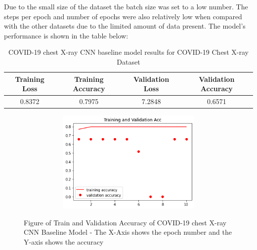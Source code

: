     \begin{table}[H]
    \centering
    \caption{COVID-19 chest X-ray CNN baseline model hyperparameters for COVID-19 Chest X-ray Dataset}
    \label{tab:COVID-19 chest X-ray CNN baseline model hyperparameters}
\end{table}
Due to the small size of the dataset the batch size was set to a low number. The steps per epoch and number of epochs were also relatively low when compared with the other datasets due to the limited amount of data present.  The model's performance is shown in the table below:
\begin{table}[H]
    \centering
    \begin{tabular}{|c|c|c|c|}
    \hline
         Training Loss
         & Training Accuracy 
         & Validation Loss
         & Validation Accuracy\\
         \hline
         0.8372  & 0.7975 & 7.2848 & 0.6571\\
         \hline
    \end{tabular}
    \caption{COVID-19 chest X-ray CNN baseline model results for COVID-19 Chest X-ray Dataset}
    \label{tab:COVID-19 chest X-ray CNN baseline model results}
\end{table}
 \begin{figure}[H]
    \centering
    \includegraphics[width=1\textwidth,height=5cm,keepaspectratio]{Images/ChestXrayCNNBaselineTrainAndValAcc.png}\\
    \caption{Figure of Train and Validation Accuracy of COVID-19 chest X-ray CNN Baseline Model - The X-Axis shows the epoch number and the Y-axis shows the accuracy}
    \label{fig:COVID-19 chest X-ray CNN Baseline Train and Validation Accuracy}
\end{figure}
